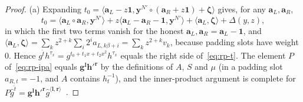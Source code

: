 \documentclass[11pt]{article}
\theoremstyle{definition}
\theoremstyle{remark}
\newcommand{\bv}{\mathbf}
\newcommand{\one}{\mathbf 1}
\begin{document}
\begin{proof}
(a) Expanding $t_0=\langle\bv a_L-z\one,\bv y^{N'}\circ(\bv a_R+z\one)+\boldsymbol\zeta\rangle$ gives, for any $\bv a_L,\bv a_R$,
\begin{equation}
  t_0=\langle\bv a_L\circ\bv a_R,\bv y^{N'}\rangle+z\langle\bv a_L-\bv a_R-\one,\bv y^{N'}\rangle+\langle\bv a_L,\boldsymbol\zeta\rangle+\Delta(y,z),
  \label{eq:t0}
\end{equation}
in which the first two terms vanish for the honest $\bv a_L,\bv a_R=\bv a_L-\one$, and $\langle\bv a_L,\boldsymbol\zeta\rangle=\sum_kz^{2+k}\sum_i2^ia_{L,k\beta+i}=\sum_kz^{2+k}v_k$, because padding slots have weight $0$. Hence $g^{\hat t}h^{\tau_x}=g^{t_0+t_1x+t_2x^2}h^{\tau_x}$ equals the right side of~\eqref{eq:rp-t}. The element $P$ of~\eqref{eq:rp-ipa} equals $\bv g^{\bv l}\bv h'^{\bv r}$ by the definitions of $A$, $S$ and $\mu$ (in a padding slot $a_{R,t}=-1$, and $A$ contains $h_t^{-1}$), and the inner-product argument is complete for $P\hat g^{\hat t}=\bv g^{\bv l}\bv h'^{\bv r}\hat g^{\langle\bv l,\bv r\rangle}$~\cite{bulletproofs}.


\end{proof}
\end{document}
